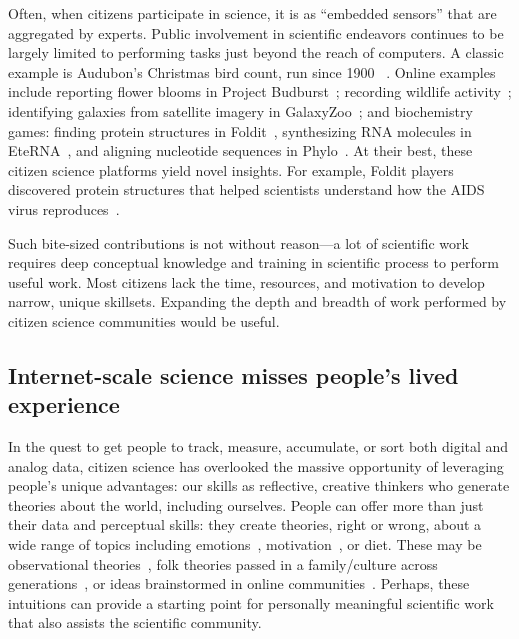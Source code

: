 Often, when citizens participate in science, it is as “embedded sensors” that 
are aggregated by experts. Public involvement in scientific endeavors continues
to be largely limited to performing tasks just beyond the reach of computers.
A classic example is Audubon’s Christmas bird count, run since 1900
~\cite{Audubon2016}. Online examples include reporting flower blooms in
Project Budburst~\cite{BoulderColorado2016}; recording wildlife activity~\cite{Faridani2009a};
identifying galaxies from satellite imagery in GalaxyZoo~\cite{Zooniverse2007}; and biochemistry games: finding protein structures in
Foldit~\cite{Cooper2010}, synthesizing RNA molecules in EteRNA~\cite{Lee2014}, and aligning 
nucleotide sequences in Phylo~\cite{Kawrykow2012}. At their
best, these citizen science platforms yield novel insights.
For example, Foldit players discovered protein structures
that helped scientists understand how the AIDS virus reproduces~\cite{Coren2011}. 

 Such bite-sized contributions is not without reason—a lot of
scientific work requires deep conceptual knowledge and 
training in scientific process to perform useful work. Most
citizens lack the time, resources, and motivation to develop
narrow, unique skillsets. Expanding the depth and breadth of work 
performed by citizen science communities would be useful.

\subsection{Internet-scale science misses people’s lived experience}
In the quest to get people to track, measure, accumulate, or
sort both digital and analog data, citizen science has overlooked the massive opportunity of leveraging people’s
unique advantages: our skills as reflective, creative thinkers
who generate theories about the world, including ourselves.
People can offer more than just their data and perceptual
skills: they create theories, right or wrong, about a wide
range of topics including emotions~\cite{Johnson-Laird1992a}, motivation~\cite{Markus1991}, or
diet. These may be observational theories~\cite{Kempton1986}, folk theories
passed in a family/culture across generations~\cite{Gelman2011}, or ideas
brainstormed in online communities~\cite{23andme2016}. Perhaps, these intuitions can provide a starting point for personally meaningful scientific work that also assists the scientific community.

